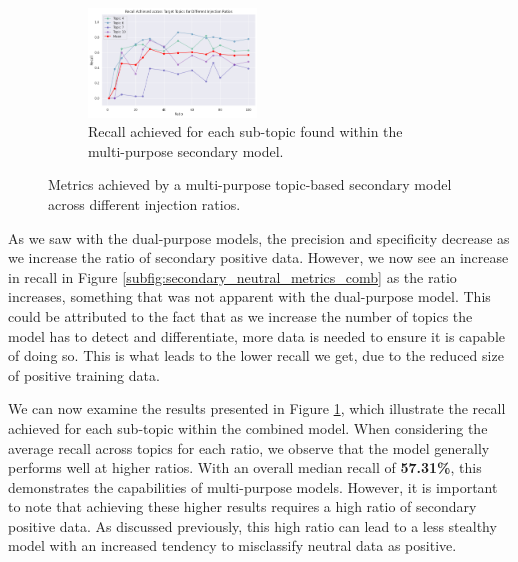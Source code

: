 \begin{figure}[ht]
    \vspace{0.2cm}

    \begin{subfigure}[b]{\textwidth}
        \centering
        \includegraphics[width=0.49\textwidth]{graphs/ratio/combined/sp.png}
        \caption{Recall achieved for each sub-topic found within the multi-purpose secondary model.}
        \label{subfig:secondary_positive_metrics_comb}
    \end{subfigure}

    \vspace{0.2cm}

    \caption{Metrics achieved by a multi-purpose topic-based secondary model across different injection ratios.}
    \label{fig:comb_topic_ratio_test_results}
\end{figure}


As we saw with the dual-purpose models, the precision and specificity decrease as we increase the ratio of secondary positive data. However, we now see an increase in recall in Figure \ref{subfig:secondary_neutral_metrics_comb} as the ratio increases, something that was not apparent with the dual-purpose model. This could be attributed to the fact that as we increase the number of topics the model has to detect and differentiate, more data is needed to ensure it is capable of doing so. This is what leads to the lower recall we get, due to the reduced size of positive training data.

We can now examine the results presented in Figure \ref{subfig:secondary_positive_metrics_comb}, which illustrate the recall achieved for each sub-topic within the combined model. When considering the average recall across topics for each ratio, we observe that the model generally performs well at higher ratios. With an overall median recall of \textbf{57.31\%}, this demonstrates the capabilities of multi-purpose models. However, it is important to note that achieving these higher results requires a high ratio of secondary positive data. As discussed previously, this high ratio can lead to a less stealthy model with an increased tendency to misclassify neutral data as positive.

